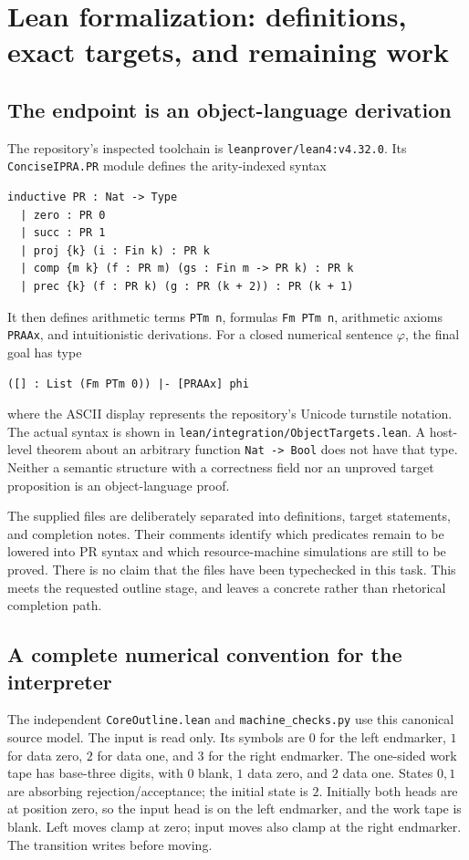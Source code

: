 \section{Lean formalization: definitions, exact targets, and remaining work}
\label{sec:formalization}

\subsection{The endpoint is an object-language derivation}
The repository's inspected toolchain is \texttt{leanprover/lean4:v4.32.0}. Its \texttt{ConciseIPRA.PR} module defines the arity-indexed syntax
\begin{lstlisting}
inductive PR : Nat -> Type
  | zero : PR 0
  | succ : PR 1
  | proj {k} (i : Fin k) : PR k
  | comp {m k} (f : PR m) (gs : Fin m -> PR k) : PR k
  | prec {k} (f : PR k) (g : PR (k + 2)) : PR (k + 1)
\end{lstlisting}
It then defines arithmetic terms \texttt{PTm n}, formulas \texttt{Fm PTm n}, arithmetic axioms \texttt{PRAAx}, and intuitionistic derivations. For a closed numerical sentence $\varphi$, the final goal has type
\begin{lstlisting}
([] : List (Fm PTm 0)) |- [PRAAx] phi
\end{lstlisting}
where the ASCII display represents the repository's Unicode turnstile notation. The actual syntax is shown in \texttt{lean/integration/ObjectTargets.lean}. A host-level theorem about an arbitrary function \texttt{Nat -> Bool} does not have that type. Neither a semantic structure with a correctness field nor an unproved target proposition is an object-language proof.

The supplied files are deliberately separated into definitions, target statements, and completion notes. Their comments identify which predicates remain to be lowered into PR syntax and which resource-machine simulations are still to be proved. There is no claim that the files have been typechecked in this task. This meets the requested outline stage, and leaves a concrete rather than rhetorical completion path.

\subsection{A complete numerical convention for the interpreter}
The independent \texttt{CoreOutline.lean} and \texttt{machine\_checks.py} use this canonical source model. The input is read only. Its symbols are $0$ for the left endmarker, $1$ for data zero, $2$ for data one, and $3$ for the right endmarker. The one-sided work tape has base-three digits, with $0$ blank, $1$ data zero, and $2$ data one. States $0,1$ are absorbing rejection/acceptance; the initial state is $2$. Initially both heads are at position zero, so the input head is on the left endmarker, and the work tape is blank. Left moves clamp at zero; input moves also clamp at the right endmarker. The transition writes before moving.

